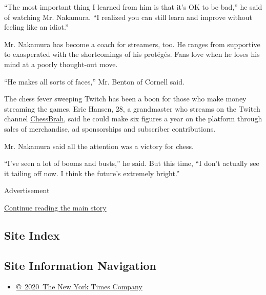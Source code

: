 ``The most important thing I learned from him is that it's OK to be
bad,'' he said of watching Mr. Nakamura. ``I realized you can still
learn and improve without feeling like an idiot.''

Mr. Nakamura has become a coach for streamers, too. He ranges from
supportive to exasperated with the shortcomings of his protégés. Fans
love when he loses his mind at a poorly thought-out move.

``He makes all sorts of faces,'' Mr. Benton of Cornell said.

The chess fever sweeping Twitch has been a boon for those who make money
streaming the games. Eric Hansen, 28, a grandmaster who streams on the
Twitch channel \href{https://www.twitch.tv/chessbrah}{ChessBrah}, said
he could make six figures a year on the platform through sales of
merchandise, ad sponsorships and subscriber contributions.

Mr. Nakamura said all the attention was a victory for chess.

``I've seen a lot of booms and busts,'' he said. But this time, ``I
don't actually see it tailing off now. I think the future's extremely
bright.''

Advertisement

\protect\hyperlink{after-bottom}{Continue reading the main story}

\hypertarget{site-index}{%
\subsection{Site Index}\label{site-index}}

\hypertarget{site-information-navigation}{%
\subsection{Site Information
Navigation}\label{site-information-navigation}}

\begin{itemize}
\tightlist
\item
  \href{https://help.nytimes3xbfgragh.onion/hc/en-us/articles/115014792127-Copyright-notice}{©~2020~The
  New York Times Company}
\end{itemize}

